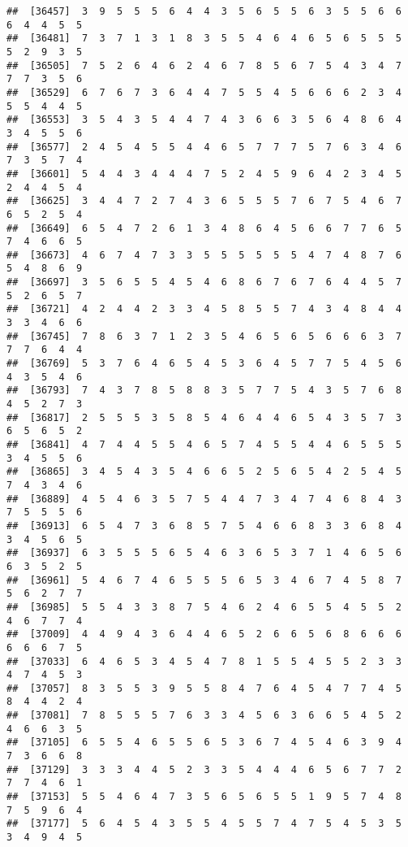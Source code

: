 \documentclass[
]{book}
\begin{document}
\begin{verbatim}
##  [36457]  3  9  5  5  5  6  4  4  3  5  6  5  5  6  3  5  5  6  6  6  4  4  5  5
##  [36481]  7  3  7  1  3  1  8  3  5  5  4  6  4  6  5  6  5  5  5  5  2  9  3  5
##  [36505]  7  5  2  6  4  6  2  4  6  7  8  5  6  7  5  4  3  4  7  7  7  3  5  6
##  [36529]  6  7  6  7  3  6  4  4  7  5  5  4  5  6  6  6  2  3  4  5  5  4  4  5
##  [36553]  3  5  4  3  5  4  4  7  4  3  6  6  3  5  6  4  8  6  4  3  4  5  5  6
##  [36577]  2  4  5  4  5  5  4  4  6  5  7  7  7  5  7  6  3  4  6  7  3  5  7  4
##  [36601]  5  4  4  3  4  4  4  7  5  2  4  5  9  6  4  2  3  4  5  2  4  4  5  4
##  [36625]  3  4  4  7  2  7  4  3  6  5  5  5  7  6  7  5  4  6  7  6  5  2  5  4
##  [36649]  6  5  4  7  2  6  1  3  4  8  6  4  5  6  6  7  7  6  5  7  4  6  6  5
##  [36673]  4  6  7  4  7  3  3  5  5  5  5  5  5  4  7  4  8  7  6  5  4  8  6  9
##  [36697]  3  5  6  5  5  4  5  4  6  8  6  7  6  7  6  4  4  5  7  5  2  6  5  7
##  [36721]  4  2  4  4  2  3  3  4  5  8  5  5  7  4  3  4  8  4  4  3  3  4  6  6
##  [36745]  7  8  6  3  7  1  2  3  5  4  6  5  6  5  6  6  6  3  7  7  7  6  4  4
##  [36769]  5  3  7  6  4  6  5  4  5  3  6  4  5  7  7  5  4  5  6  4  3  5  4  6
##  [36793]  7  4  3  7  8  5  8  8  3  5  7  7  5  4  3  5  7  6  8  4  5  2  7  3
##  [36817]  2  5  5  5  3  5  8  5  4  6  4  4  6  5  4  3  5  7  3  6  5  6  5  2
##  [36841]  4  7  4  4  5  5  4  6  5  7  4  5  5  4  4  6  5  5  5  3  4  5  5  6
##  [36865]  3  4  5  4  3  5  4  6  6  5  2  5  6  5  4  2  5  4  5  7  4  3  4  6
##  [36889]  4  5  4  6  3  5  7  5  4  4  7  3  4  7  4  6  8  4  3  7  5  5  5  6
##  [36913]  6  5  4  7  3  6  8  5  7  5  4  6  6  8  3  3  6  8  4  3  4  5  6  5
##  [36937]  6  3  5  5  5  6  5  4  6  3  6  5  3  7  1  4  6  5  6  6  3  5  2  5
##  [36961]  5  4  6  7  4  6  5  5  5  6  5  3  4  6  7  4  5  8  7  5  6  2  7  7
##  [36985]  5  5  4  3  3  8  7  5  4  6  2  4  6  5  5  4  5  5  2  4  6  7  7  4
##  [37009]  4  4  9  4  3  6  4  4  6  5  2  6  6  5  6  8  6  6  6  6  6  6  7  5
##  [37033]  6  4  6  5  3  4  5  4  7  8  1  5  5  4  5  5  2  3  3  4  7  4  5  3
##  [37057]  8  3  5  5  3  9  5  5  8  4  7  6  4  5  4  7  7  4  5  8  4  4  2  4
##  [37081]  7  8  5  5  5  7  6  3  3  4  5  6  3  6  6  5  4  5  2  4  6  6  3  5
##  [37105]  6  5  5  4  6  5  5  6  5  3  6  7  4  5  4  6  3  9  4  7  3  6  6  8
##  [37129]  3  3  3  4  4  5  2  3  3  5  4  4  4  6  5  6  7  7  2  7  7  4  6  1
##  [37153]  5  5  4  6  4  7  3  5  6  5  6  5  5  1  9  5  7  4  8  7  5  9  6  4
##  [37177]  5  6  4  5  4  3  5  5  4  5  5  7  4  7  5  4  5  3  5  3  4  9  4  5

\end{verbatim}
\end{document}
